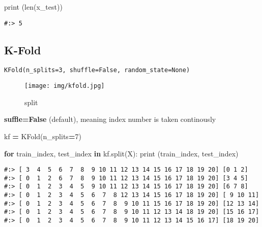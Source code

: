 \documentclass[
]{book}
\newenvironment{Shaded}{\begin{snugshade}}{\end{snugshade}}
\newcommand{\BuiltInTok}[1]{#1}
\newcommand{\ControlFlowTok}[1]{\textcolor[rgb]{0.27,0.27,0.27}{\textbf{#1}}}
\newcommand{\DecValTok}[1]{\textcolor[rgb]{0.06,0.06,0.06}{#1}}
\newcommand{\KeywordTok}[1]{\textcolor[rgb]{0.27,0.27,0.27}{\textbf{#1}}}
\newcommand{\NormalTok}[1]{#1}
\newcommand{\OperatorTok}[1]{\textcolor[rgb]{0.43,0.43,0.43}{\textbf{#1}}}
\begin{document}
\begin{Shaded}
\begin{Highlighting}[]
\BuiltInTok{print}\NormalTok{ (}\BuiltInTok{len}\NormalTok{(x\_test))}
\end{Highlighting}
\end{Shaded}

\begin{verbatim}
#:> 5
\end{verbatim}

\hypertarget{k-fold}{%
\subsection{K-Fold}\label{k-fold}}

\begin{verbatim}
KFold(n_splits=3, shuffle=False, random_state=None)
\end{verbatim}

\begin{figure}
\centering
\texttt{[image: img/kfold.jpg]}
\caption{split}
\end{figure}

\textbf{suffle=False} (default), meaning index number is taken continously

\begin{Shaded}
\begin{Highlighting}[]
\NormalTok{kf }\OperatorTok{=}\NormalTok{ KFold(n\_splits}\OperatorTok{=}\DecValTok{7}\NormalTok{)}
\end{Highlighting}
\end{Shaded}

\begin{Shaded}
\begin{Highlighting}[]
\ControlFlowTok{for}\NormalTok{ train\_index, test\_index }\KeywordTok{in}\NormalTok{ kf.split(X):}
  \BuiltInTok{print}\NormalTok{ (train\_index, test\_index)}
\end{Highlighting}
\end{Shaded}

\begin{verbatim}
#:> [ 3  4  5  6  7  8  9 10 11 12 13 14 15 16 17 18 19 20] [0 1 2]
#:> [ 0  1  2  6  7  8  9 10 11 12 13 14 15 16 17 18 19 20] [3 4 5]
#:> [ 0  1  2  3  4  5  9 10 11 12 13 14 15 16 17 18 19 20] [6 7 8]
#:> [ 0  1  2  3  4  5  6  7  8 12 13 14 15 16 17 18 19 20] [ 9 10 11]
#:> [ 0  1  2  3  4  5  6  7  8  9 10 11 15 16 17 18 19 20] [12 13 14]
#:> [ 0  1  2  3  4  5  6  7  8  9 10 11 12 13 14 18 19 20] [15 16 17]
#:> [ 0  1  2  3  4  5  6  7  8  9 10 11 12 13 14 15 16 17] [18 19 20]
\end{verbatim}
\end{document}
